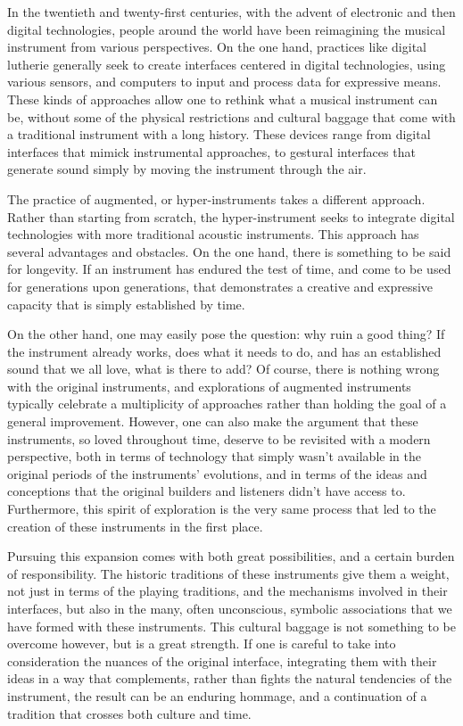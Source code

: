 \documentclass[12pt,twoside,maitrise]{dms_ks}
\theoremstyle{definition}
\begin{document}
In the twentieth and twenty-first centuries, with the advent of electronic and then digital technologies, people around the world have been reimagining the musical instrument from various perspectives. 
On the one hand, practices like digital lutherie generally seek to create interfaces centered in digital technologies, using various sensors, and computers to input and process data for expressive means. 
These kinds of approaches allow one to rethink what a musical instrument can be, without some of the physical restrictions and cultural baggage that come with a traditional instrument with a long history. 
These devices range from digital interfaces that mimick instrumental approaches, to gestural interfaces that generate sound simply by moving the instrument through the air.

The practice of augmented, or hyper-instruments takes a different approach. 
Rather than starting from scratch, the hyper-instrument seeks to integrate digital technologies with more traditional acoustic instruments. 
This approach has several advantages and obstacles. 
On the one hand, there is something to be said for longevity.
If an instrument has endured the test of time, and come to be used for generations upon generations, that demonstrates a creative and expressive capacity that is simply established by time.

On the other hand, one may easily pose the question: why ruin a good thing?
If the instrument already works, does what it needs to do, and has an established sound that we all love, what is there to add?
Of course, there is nothing wrong with the original instruments, and explorations of augmented instruments typically celebrate a multiplicity of approaches rather than holding the goal of a general improvement.
However, one can also make the argument that these instruments, so loved throughout time, deserve to be revisited with a modern perspective, both in terms of technology that simply wasn't available in the original periods of the instruments' evolutions, and in terms of the ideas and conceptions that the original builders and listeners didn't have access to. Furthermore, this spirit of exploration is the very same process that led to the creation of these instruments in the first place.

Pursuing this expansion comes with both great possibilities, and a certain burden of responsibility.
The historic traditions of these instruments give them a weight, not just in terms of the playing traditions, and the mechanisms involved in their interfaces, but also in the many, often unconscious, symbolic associations that we have formed with these instruments.
This cultural baggage is not something to be overcome however, but is a great strength.
If one is careful to take into consideration the nuances of the original interface, integrating them with their ideas in a way that complements, rather than fights the natural tendencies of the instrument, the result can be an enduring hommage, and a continuation of a tradition that crosses both culture and time.
\end{document}
